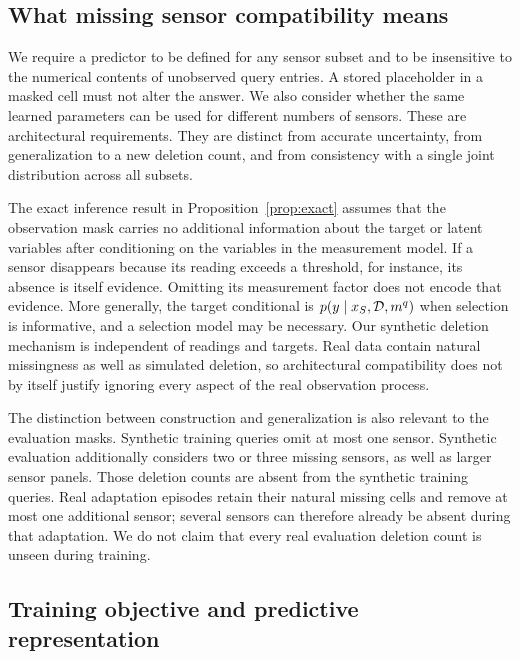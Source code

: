 \subsection{What missing sensor compatibility means}

We require a predictor to be defined for any sensor subset and to be insensitive to the numerical contents of unobserved query entries. A stored placeholder in a masked cell must not alter the answer. We also consider whether the same learned parameters can be used for different numbers of sensors. These are architectural requirements. They are distinct from accurate uncertainty, from generalization to a new deletion count, and from consistency with a single joint distribution across all subsets.

The exact inference result in Proposition~\ref{prop:exact} assumes that the observation mask carries no additional information about the target or latent variables after conditioning on the variables in the measurement model. If a sensor disappears because its reading exceeds a threshold, for instance, its absence is itself evidence. Omitting its measurement factor does not encode that evidence. More generally, the target conditional is $p(y\mid x_S,\mathcal{D},m^q)$ when selection is informative, and a selection model may be necessary. Our synthetic deletion mechanism is independent of readings and targets. Real data contain natural missingness as well as simulated deletion, so architectural compatibility does not by itself justify ignoring every aspect of the real observation process.

The distinction between construction and generalization is also relevant to the evaluation masks. Synthetic training queries omit at most one sensor. Synthetic evaluation additionally considers two or three missing sensors, as well as larger sensor panels. Those deletion counts are absent from the synthetic training queries. Real adaptation episodes retain their natural missing cells and remove at most one additional sensor; several sensors can therefore already be absent during that adaptation. We do not claim that every real evaluation deletion count is unseen during training.

\subsection{Training objective and predictive representation}

